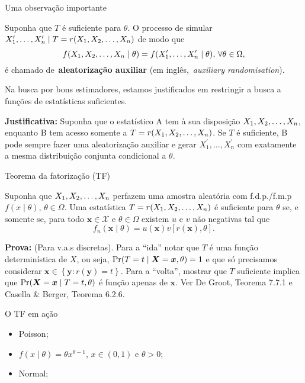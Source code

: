 \begin{frame}{Uma observação importante}

\begin{defn}
 \label{def:auxiliary_randomisation}
 Suponha que $T$ é suficiente para $\theta$. 
 O processo de simular $X_1^\prime, \ldots, X_n^\prime \mid T = r(X_1, X_2, \ldots, X_n)$ de modo que
 \[ f(X_1, X_2, \ldots, X_n \mid \theta) = f(X_1^\prime, \ldots, X_n^\prime \mid \theta),\, \forall \theta \in \Omega, \]
é chamado de~\textbf{aleatorização auxiliar} (em inglês,~\textit{auxiliary randomisation}).
\end{defn}
\begin{obs}
\label{rmk:good_estimators_sufficient}
 Na busca por bons estimadores, estamos justificados em restringir a busca a funções de estatísticas suficientes.
\end{obs}
\textbf{Justificativa:} Suponha que o estatístico A tem à sua disposição $X_1, X_2, \ldots, X_n$, enquanto B tem acesso somente a $T  = r(X_1, X_2, \ldots, X_n)$.
Se $T$ é suficiente, B pode sempre fazer uma aleatorização auxiliar e gerar $X_1^\prime, \ldots, X_n^\prime$ com exatamente a mesma distribuição conjunta condicional a $\theta$.
\end{frame}

\begin{frame}{Teorema da fatorização (TF)}
\begin{theo}
 \label{thm:factorisation}
Suponha que $X_1, X_2, \ldots, X_n$ perfazem uma amostra aleatória com f.d.p./f.m.p $f(x \mid \theta)$, $\theta \in \Omega$.
Uma estatística $T = r(X_1, X_2, \ldots, X_n)$ é suficiente para $\theta$ se, e somente se, para todo $\boldsymbol{x} \in \mathcal{X}$ e $\theta \in \Omega$ existem $u$ e $v$ não negativas tal que
\begin{equation*}
 f_n(\boldsymbol{x} \mid \theta) = u(\boldsymbol{x}) v[r(\boldsymbol{x}), \theta].
\end{equation*}
\end{theo}
\textbf{Prova:} (Para v.a.s discretas).
Para a ``ida'' notar que $T$ é uma função determinística de $X$, ou seja, $\operatorname{Pr}(T = t \mid \boldsymbol{X} = \boldsymbol{x} , \theta) = 1$ e que só precisamos considerar $\boldsymbol{x} \in \left\{ \boldsymbol{y} : r(\boldsymbol{y}) = t \right\}$.
Para a ``volta'', mostrar que $T$ suficiente implica que $\operatorname{Pr}(\boldsymbol{X} = \boldsymbol{x} \mid T = t, \theta)$ é função apenas de $\boldsymbol{x}$.
Ver De Groot, Teorema 7.7.1 e Casella \& Berger, Teorema 6.2.6.
\end{frame}

\begin{frame}{O TF em ação}
\begin{itemize}
 \item Poisson;
 \item $f(x\mid\theta) = \theta x^{\theta-1}$, $x \in (0, 1)$ e $\theta > 0$;
 \item Normal;
\end{itemize} 
\end{frame}

